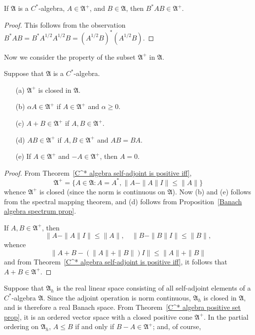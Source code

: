 \begin{corollary}\label{C^* algebra unitary equivalent positive}
If $\mathfrak{A}$ is a $C^*$-algebra, $A\in\mathfrak{A}^+$, and $B\in\mathfrak{A}$, then $B^*AB\in\mathfrak{A}^+$.
\end{corollary}
\begin{proof}
This follows from the observation $B^*AB=B^*A^{1/2}A^{1/2}B=(A^{1/2}B)^*(A^{1/2}B)$.
\end{proof}
Now we consider the property of the subset $\mathfrak{A}^+$ in $\mathfrak{A}$.
\begin{theorem}\label{C^* algebra positive set prop}
Suppose that $\mathfrak{A}$ is a $C^*$-algebra.
\begin{itemize}
\item[(a)] $\mathfrak{A}^+$ is closed in $\mathfrak{A}$.
\item[(b)] $\alpha A\in\mathfrak{A}^+$ if $A\in\mathfrak{A}^+$ and $\alpha\geq 0$.
\item[(c)] $A+B\in\mathfrak{A}^+$ if $A,B\in\mathfrak{A}^+$.
\item[(d)] $AB\in\mathfrak{A}^+$ if $A,B\in\mathfrak{A}^+$ and $AB=BA$.
\item[(e)] If $A\in\mathfrak{A}^+$ and $-A\in\mathfrak{A}^+$, then $A=0$. 
\end{itemize}
\end{theorem}
\begin{proof}
From Theorem~\ref{C^* algebra self-adjoint is positive iff},
\[\mathfrak{A}^+=\{A\in\mathfrak{A}:A=A^*,\|A-\|A\|I\|\leq\|A\|\}\]
whence $\mathfrak{A}^+$ is closed (since the norm is continuous on $\mathfrak{A}$). Now (b) and (e) follows from the spectral mapping theorem, and (d) follows from Proposition~\ref{Banach algebra spectrum prop}.\par
If $A,B\in\mathfrak{A}^+$, then
\[\|A-\|A\|I\|\leq\|A\|,\quad \|B-\|B\|I\|\leq\|B\|,\]
whence
\[\|A+B-(\|A\|+\|B\|)I\|\leq\|A\|+\|B\|\]
and from Theorem~\ref{C^* algebra self-adjoint is positive iff}, it follows that $A+B\in\mathfrak{A}^+$.
\end{proof}
Suppose that $\mathfrak{A}_h$ is the real linear space consisting of all self-adjoint elements of a $C^*$-algebra $\mathfrak{A}$. Since the adjoint operation is norm continuous, $\mathfrak{A}_h$ is closed in $\mathfrak{A}$, and is therefore a real Banach space. From Theorem~\ref{C^* algebra positive set prop}, it is an ordered vector space with a closed positive cone $\mathfrak{A}^+$. In the partial ordering on $\mathfrak{A}_h$, $A\leq B$ if and only if $B-A\in\mathfrak{A}^+$; and, of course,

